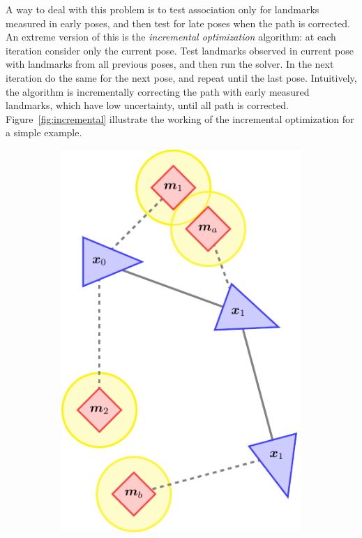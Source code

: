 A way to deal with this problem is to test association only for landmarks measured in early poses, and then test for late poses when the path is corrected. An extreme version of this is the \emph{incremental optimization} algorithm: at each iteration consider only the current pose. Test landmarks observed in current pose with landmarks from all previous poses, and then run the solver. In the next iteration do the same for the next pose, and repeat until the last pose. Intuitively, the algorithm is incrementally correcting the path with early measured landmarks, which have low uncertainty, until all path is corrected. Figure~\ref{fig:incremental} illustrate the working of the incremental optimization for a simple example.

\begin{figure}[htbp!]
    \centering
    \begin{subfigure}[htbp!]{0.25\textwidth} 
    \centering
    \includegraphics[width=\textwidth]{tikz/incremental1.pdf}

\end{subfigure}
\end{figure}
